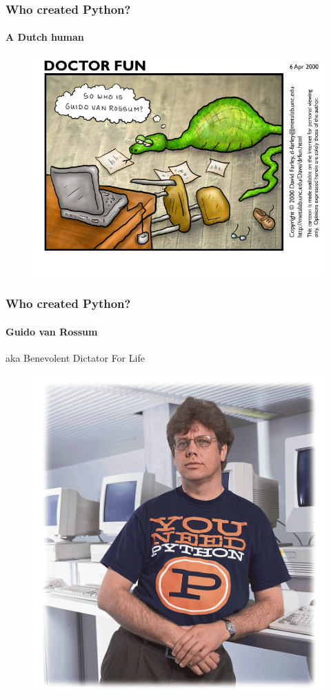 \documentclass[handout]{beamer}
\begin{document}
\begin{frame}
\frametitle{Who created Python?}
\framesubtitle{A Dutch human}
\begin{figure}
\includegraphics[scale=0.45]{df20000406.jpg}
\end{figure}

\end{frame}

\begin{frame}
\frametitle{Who created Python?}
\framesubtitle{Guido van Rossum}
\centering aka Benevolent Dictator For Life

\begin{figure}
\includegraphics[scale=0.12]{guido.jpg}
\end{figure}
\end{frame}
\end{document}
